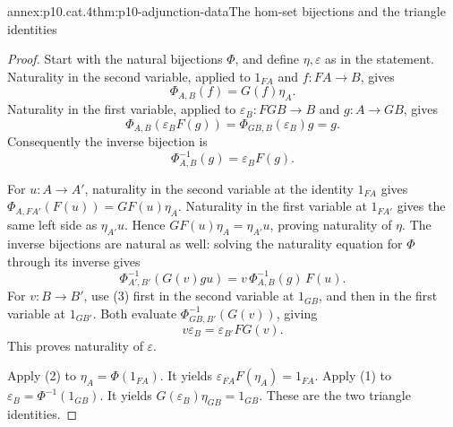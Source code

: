 \begin{annexitem}{annex:p10.cat.4}{thm:p10-adjunction-data}{The hom-set bijections and the triangle identities}
\begin{proof}
Start with the natural bijections \(\Phi\), and define
\(\eta,\varepsilon\) as in the statement.
Naturality in the second variable, applied to \(1_{F A}\)
and \(f:F A\to B\), gives
\[
                         \Phi_{A,B}(f)=G(f)\eta_A.             \tag{1}
\]
Naturality in the first variable, applied to
\(\varepsilon_B:FGB\to B\) and \(g:A\to G B\), gives
\[
 \Phi_{A,B}(\varepsilon_B F(g))
       =\Phi_{G B,B}(\varepsilon_B)g=g.
\]
Consequently the inverse bijection is
\[
                         \Phi^{-1}_{A,B}(g)=\varepsilon_B F(g).
                                                                  \tag{2}
\]

For \(u:A\to A'\), naturality in the second variable at the
identity \(1_{F A}\) gives
\(\Phi_{A,F A'}(F(u))=GF(u)\eta_A\).
Naturality in the first variable at \(1_{F A'}\) gives the
same left side as \(\eta_{A'}u\).
Hence \(GF(u)\eta_A=\eta_{A'}u\), proving naturality of \(\eta\).
The inverse bijections are natural as well: solving the
naturality equation for \(\Phi\) through its inverse gives
\[
 \Phi^{-1}_{A',B'}(G(v)g u)
       =v\,\Phi^{-1}_{A,B}(g)\,F(u).
                                                                  \tag{3}
\]
For \(v:B\to B'\), use (3) first in the second variable at
\(1_{G B}\), and then in the first variable at \(1_{G B'}\).
Both evaluate \(\Phi^{-1}_{G B,B'}(G(v))\), giving
\[
                       v\varepsilon_B=\varepsilon_{B'}FG(v).
                                                                  \tag{4}
\]
This proves naturality of \(\varepsilon\).

Apply (2) to \(\eta_A=\Phi(1_{F A})\).
It yields \(\varepsilon_{F A}F(\eta_A)=1_{F A}\).
Apply (1) to \(\varepsilon_B=\Phi^{-1}(1_{G B})\).
It yields \(G(\varepsilon_B)\eta_{G B}=1_{G B}\).
These are the two triangle identities.


\end{proof}
\end{annexitem}
